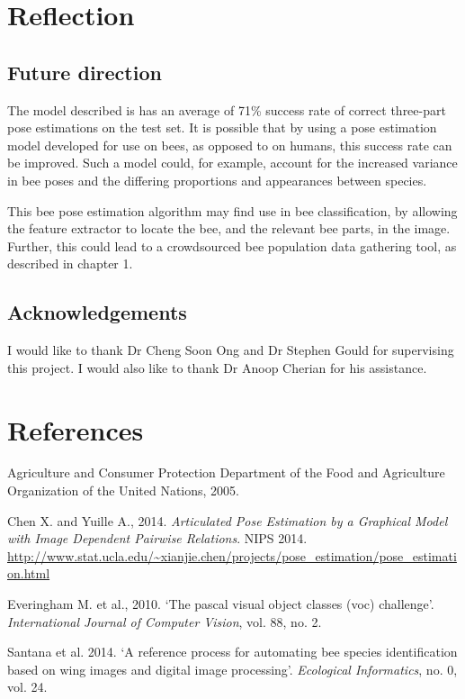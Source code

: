 \documentclass[11pt, oneside]{report}
\begin{document}
\chapter{Reflection}
    \section{Future direction}
        The model described is has an average of 71\% success rate of correct three-part pose estimations on the test set. It is possible that by using a pose estimation model developed for use on bees, as opposed to on humans, this success rate can be improved. Such a model could, for example, account for the increased variance in bee poses and the differing proportions and appearances between species.

        This bee pose estimation algorithm may find use in bee classification, by allowing the feature extractor to locate the bee, and the relevant bee parts, in the image. Further, this could lead to a crowdsourced bee population data gathering tool, as described in chapter 1.

    \section{Acknowledgements}
        I would like to thank Dr Cheng Soon Ong and Dr Stephen Gould for supervising this project. I would also like to thank Dr Anoop Cherian for his assistance.

\chapter{References}

Agriculture and Consumer Protection Department of the Food and Agriculture Organization of the United Nations, 2005.

Chen X. and Yuille A., 2014. \textit{Articulated Pose Estimation by a Graphical Model with Image Dependent Pairwise Relations}. NIPS 2014.
\url{http://www.stat.ucla.edu/~xianjie.chen/projects/pose_estimation/pose_estimation.html}

Everingham M. et al., 2010. `The pascal visual object classes (voc) challenge'. \textit{International Journal of Computer Vision}, vol. 88, no. 2.

Santana et al. 2014. `A reference process for automating bee species identification based on wing images and digital image processing'. \textit{Ecological Informatics}, no. 0, vol. 24.
\end{document}
